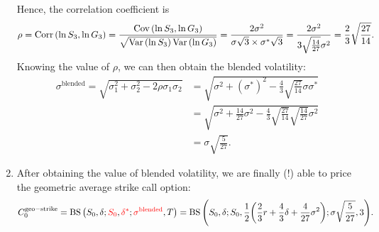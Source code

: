 \begin{enumerate}
Hence, the correlation coefficient is
\[
\rho=\operatorname{Corr}\qty(\ln S_3,\ln G_3)
=\frac{\operatorname{Cov}\qty(\ln S_3,\ln G_3)}{\sqrt{\operatorname{Var}\qty(\ln S_3)\operatorname{Var}\qty(\ln G_3)}}
=\frac{2\sigma^2}{\sigma\sqrt{3}\times \sigma^*\sqrt{3}}
=\frac{2\sigma^2}{3\sqrt{\frac{14}{27}}\sigma^{2}}
=\frac{2}{3}\sqrt{\frac{27}{14}}.
\]
Knowing the value of \(\rho\), we can then obtain the blended volatility:
\begin{align*}
\sigma^{\mathrm{blended}}=\sqrt{\sigma_1^2+\sigma_2^2-2\rho\sigma_1\sigma_2}
&=\sqrt{\sigma^2+(\sigma^*)^{2}-\frac{4}{3}\sqrt{\frac{27}{14}}\sigma\sigma^*} \\
&=\sqrt{\sigma^2+\frac{14}{27}\sigma^2-\frac{4}{3}\sqrt{\frac{27}{14}}\sqrt{\frac{14}{27}}\sigma^2} \\
&=\sigma\sqrt{\frac{5}{27}}.
\end{align*}
\item After obtaining the value of blended volatility, we are finally (!) able
to price the geometric average strike call option:
\[
C_0^{\mathrm{geo-strike}}=\operatorname{BS}\qty(S_0,\delta;{\color{red}S_0},{\color{red}\delta^{*}};{\color{red}\sigma^{\mathrm{blended}}},T)
=\operatorname{BS}\qty(S_0,\delta;S_0,\frac{1}{2}\qty(\frac{2}{3}r+\frac{4}{3}\delta+\frac{4}{27}\sigma^2);\sigma\sqrt{\frac{5}{27}},3).
\]
\end{enumerate}
